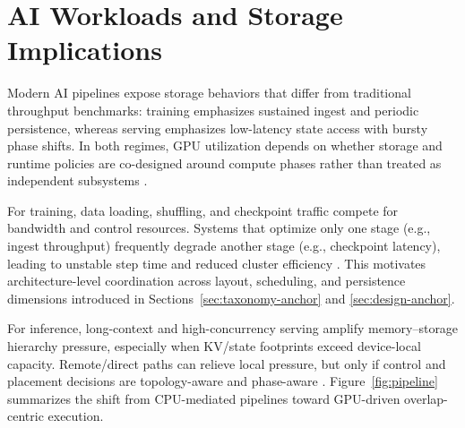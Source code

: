 \section{AI Workloads and Storage Implications}

Modern AI pipelines expose storage behaviors that differ from traditional throughput benchmarks: training emphasizes sustained ingest and periodic persistence, whereas serving emphasizes low-latency state access with bursty phase shifts. In both regimes, GPU utilization depends on whether storage and runtime policies are co-designed around compute phases rather than treated as independent subsystems \cite{murray2021tfdata,hoard2018,kwon2023vllm,zhong2024distserve}.

For training, data loading, shuffling, and checkpoint traffic compete for bandwidth and control resources. Systems that optimize only one stage (e.g., ingest throughput) frequently degrade another stage (e.g., checkpoint latency), leading to unstable step time and reduced cluster efficiency \cite{rajbhandari2021zeroinfinity,geminifs2025}. This motivates architecture-level coordination across layout, scheduling, and persistence dimensions introduced in Sections~\ref{sec:taxonomy-anchor} and \ref{sec:design-anchor}.

For inference, long-context and high-concurrency serving amplify memory--storage hierarchy pressure, especially when KV/state footprints exceed device-local capacity. Remote/direct paths can relieve local pressure, but only if control and placement decisions are topology-aware and phase-aware \cite{nvidia_gdrdma,nvmeof_spec,liu2017rackscale,qureshi2023bam}. Figure~\ref{fig:pipeline} summarizes the shift from CPU-mediated pipelines toward GPU-driven overlap-centric execution.
